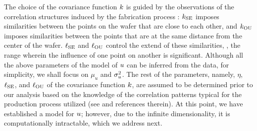 The choice of the covariance function $\fCov$ is guided by the observations of the correlation structures induced by the fabrication process \cite{chandrakasan2001, cheng2011}: $\fCov_\SE$ imposes similarities between the points on the wafer that are close to each other, and $\fCov_\OU$ imposes similarities between the points that are at the same distance from the center of the wafer.
$\ell_{\text{SE}}$ and $\ell_{\text{OU}}$ control the extend of these similarities, \ie, the range wherein the influence of one point on another is significant.
Although all the above parameters of the model of $u$ can be inferred from the data, for simplicity, we shall focus on $\mu_u$ and $\sigma_u^2$.
The rest of the parameters, namely, $\eta$, $\ell_{\text{SE}}$, and $\ell_{\text{OU}}$ of the covariance function $\fCov$, are assumed to be determined prior to our analysis based on the knowledge of the correlation patterns typical for the production process utilized (see \cite{marzouk2009} and references therein).
At this point, we have established a model for $u$; however, due to the infinite dimensionality, it is computationally intractable, which we address next.



